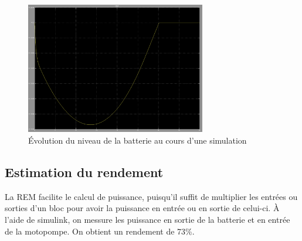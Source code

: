 \begin{figure}[ht]
	\begin{center}
	\includegraphics[width=0.7\textwidth]{images/Niveau_batt.png}
	\caption{Évolution du niveau de la batterie au cours d'une simulation}\label{img:NivBatt}
	\end{center}
\end{figure}
\FloatBarrier 




\subsection{Estimation du rendement}

La REM facilite le calcul de puissance, puisqu'il suffit de multiplier les entrées ou sorties d'un bloc pour avoir la puissance en entrée ou en  sortie de celui-ci. À l'aide de simulink, on messure les puissance en sortie de la batterie et en entrée de la motopompe. On obtient un rendement de 73\%.



